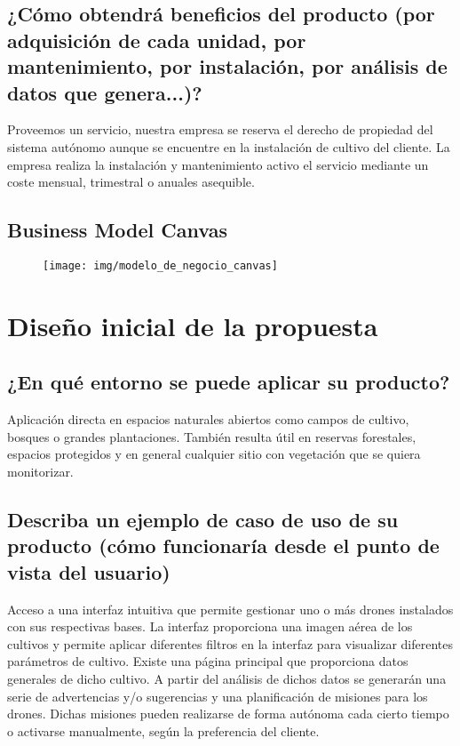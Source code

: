 \documentclass[11pt,spanish]{article} %
\begin{document}
\subsection{¿Cómo obtendrá beneficios del producto (por adquisición de cada unidad, por mantenimiento, por instalación, por análisis de datos que genera...)?}
Proveemos un servicio, nuestra empresa se reserva el derecho de propiedad del sistema autónomo aunque se encuentre en la instalación de cultivo del cliente. La empresa realiza la instalación y mantenimiento activo el servicio mediante un coste mensual, trimestral o anuales asequible.

\subsection{Business Model Canvas}
\begin{figure}[H]
	\centering
	\texttt{[image: img/modelo\_de\_negocio\_canvas]}
	\label{fig:business_model_canvas}
\end{figure}

\newpage

\section{Diseño inicial de la propuesta}

\subsection{¿En qué entorno se puede aplicar su producto?}
Aplicación directa en espacios naturales abiertos como campos de cultivo, bosques o grandes plantaciones. También resulta útil en reservas forestales, espacios protegidos y en general cualquier sitio con vegetación que se quiera monitorizar.


\subsection{Describa un ejemplo de caso de uso de su producto (cómo funcionaría desde el punto de vista del usuario)}

Acceso a una interfaz intuitiva que permite gestionar uno o más drones instalados con sus respectivas bases. La interfaz proporciona una imagen aérea de los cultivos y permite aplicar diferentes filtros en la interfaz para visualizar diferentes parámetros de cultivo. Existe una página principal que proporciona datos generales de dicho cultivo. A partir del análisis de dichos datos se generarán una serie de advertencias y/o sugerencias y una planificación de misiones para los drones. Dichas misiones pueden realizarse de forma autónoma cada cierto tiempo o activarse manualmente, según la preferencia del cliente.
\end{document}
